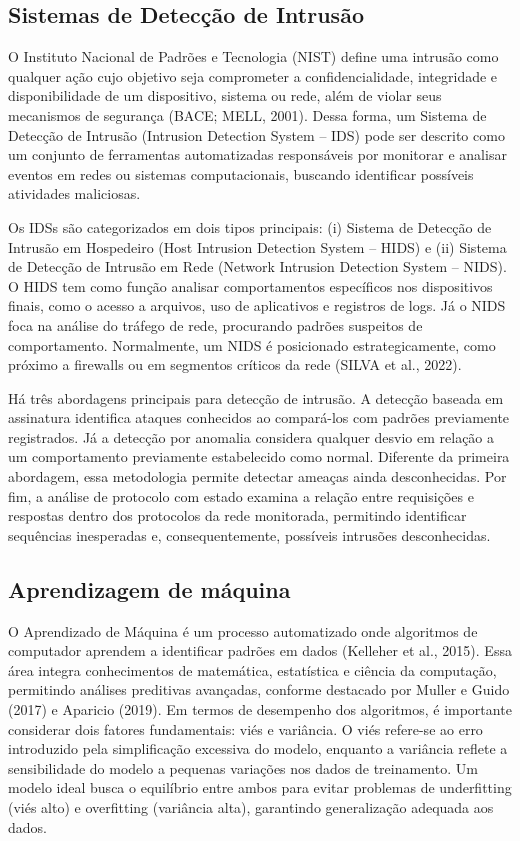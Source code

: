 \documentclass[conference]{IEEEtran}
\begin{document}
\subsection {Sistemas de Detecção de Intrusão}

    O Instituto Nacional de Padrões e Tecnologia (NIST) define uma intrusão como qualquer ação cujo objetivo seja comprometer a confidencialidade, integridade e disponibilidade de um dispositivo, sistema ou rede, além de violar seus mecanismos de segurança (BACE; MELL, 2001). Dessa forma, um Sistema de Detecção de Intrusão (Intrusion Detection System – IDS) pode ser descrito como um conjunto de ferramentas automatizadas responsáveis por monitorar e analisar eventos em redes ou sistemas computacionais, buscando identificar possíveis atividades maliciosas.
    
    Os IDSs são categorizados em dois tipos principais: (i) Sistema de Detecção de Intrusão em Hospedeiro (Host Intrusion Detection System – HIDS) e (ii) Sistema de Detecção de Intrusão em Rede (Network Intrusion Detection System – NIDS). O HIDS tem como função analisar comportamentos específicos nos dispositivos finais, como o acesso a arquivos, uso de aplicativos e registros de logs. Já o NIDS foca na análise do tráfego de rede, procurando padrões suspeitos de comportamento. Normalmente, um NIDS é posicionado estrategicamente, como próximo a firewalls ou em segmentos críticos da rede (SILVA et al., 2022).
    
    Há três abordagens principais para detecção de intrusão. A detecção baseada em assinatura identifica ataques conhecidos ao compará-los com padrões previamente registrados. Já a detecção por anomalia considera qualquer desvio em relação a um comportamento previamente estabelecido como normal. Diferente da primeira abordagem, essa metodologia permite detectar ameaças ainda desconhecidas. Por fim, a análise de protocolo com estado examina a relação entre requisições e respostas dentro dos protocolos da rede monitorada, permitindo identificar sequências inesperadas e, consequentemente, possíveis intrusões desconhecidas.


\subsection{Aprendizagem de máquina}

    O Aprendizado de Máquina é um processo automatizado onde algoritmos de computador aprendem a identificar padrões em dados (Kelleher et al., 2015). Essa área integra conhecimentos de matemática, estatística e ciência da computação, permitindo análises preditivas avançadas, conforme destacado por Muller e Guido (2017) e Aparicio (2019). Em termos de desempenho dos algoritmos, é importante considerar dois fatores fundamentais: viés e variância. O viés refere-se ao erro introduzido pela simplificação excessiva do modelo, enquanto a variância reflete a sensibilidade do modelo a pequenas variações nos dados de treinamento. Um modelo ideal busca o equilíbrio entre ambos para evitar problemas de underfitting (viés alto) e overfitting (variância alta), garantindo generalização adequada aos dados.
\end{document}

